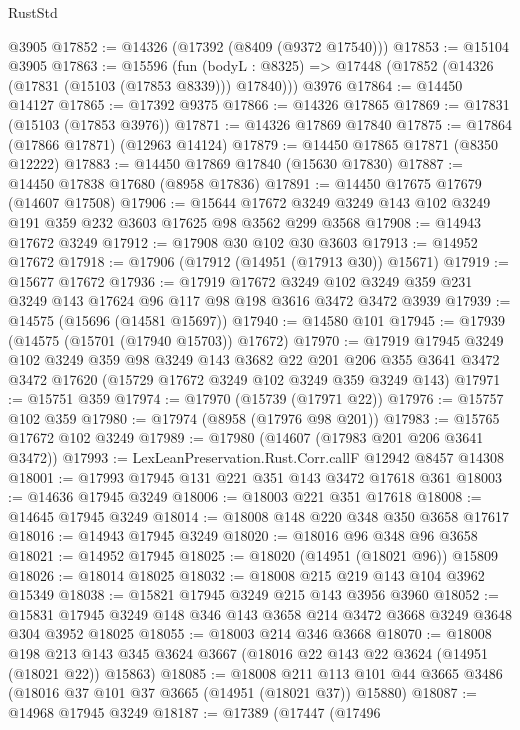 \begin{lexlean}{RustStd}
\begin{coremodule}
    @3905
@17852 := @14326 (@17392 (@8409 (@9372 @17540)))
@17853 := @15104 @3905
@17863 := @15596
    (fun (bodyL : @8325) => @17448 (@17852 (@14326 (@17831 (@15103 (@17853 @8339))) @17840)))
    @3976
@17864 := @14450 @14127
@17865 := @17392 @9375
@17866 := @14326 @17865
@17869 := @17831 (@15103 (@17853 @3976))
@17871 := @14326 @17869 @17840
@17875 := @17864 (@17866 @17871) (@12963 @14124)
@17879 := @14450 @17865 @17871 (@8350 @12222)
@17883 := @14450 @17869 @17840 (@15630 @17830)
@17887 := @14450 @17838 @17680 (@8958 @17836)
@17891 := @14450 @17675 @17679 (@14607 @17508)
@17906 := @15644 @17672 @3249 @3249 @143 @102 @3249 @191 @359 @232 @3603 @17625 @98 @3562 @299 @3568
@17908 := @14943 @17672 @3249
@17912 := @17908 @30 @102 @30 @3603
@17913 := @14952 @17672
@17918 := @17906 (@17912 (@14951 (@17913 @30)) @15671)
@17919 := @15677 @17672
@17936 := @17919
    @17672
    @3249
    @102
    @3249
    @359
    @231
    @3249
    @143
    @17624
    @96
    @117
    @98
    @198
    @3616
    @3472
    @3472
    @3939
@17939 := @14575 (@15696 (@14581 @15697))
@17940 := @14580 @101
@17945 := @17939 (@14575 (@15701 (@17940 @15703)) @17672)
@17970 := @17919
    @17945
    @3249
    @102
    @3249
    @359
    @98
    @3249
    @143
    @3682
    @22
    @201
    @206
    @355
    @3641
    @3472
    @3472
    @17620
    (@15729 @17672 @3249 @102 @3249 @359 @3249 @143)
@17971 := @15751 @359
@17974 := @17970 (@15739 (@17971 @22))
@17976 := @15757 @102 @359
@17980 := @17974 (@8958 (@17976 @98 @201))
@17983 := @15765 @17672 @102 @3249
@17989 := @17980 (@14607 (@17983 @201 @206 @3641 @3472))
@17993 := LexLeanPreservation.Rust.Corr.callF @12942 @8457 @14308
@18001 := @17993 @17945 @131 @221 @351 @143 @3472 @17618 @361
@18003 := @14636 @17945 @3249
@18006 := @18003 @221 @351 @17618
@18008 := @14645 @17945 @3249
@18014 := @18008 @148 @220 @348 @350 @3658 @17617
@18016 := @14943 @17945 @3249
@18020 := @18016 @96 @348 @96 @3658
@18021 := @14952 @17945
@18025 := @18020 (@14951 (@18021 @96)) @15809
@18026 := @18014 @18025
@18032 := @18008 @215 @219 @143 @104 @3962 @15349
@18038 := @15821 @17945 @3249 @215 @143 @3956 @3960
@18052 := @15831 @17945 @3249 @148 @346 @143 @3658 @214 @3472 @3668 @3249 @3648 @304 @3952 @18025
@18055 := @18003 @214 @346 @3668
@18070 := @18008
    @198
    @213
    @143
    @345
    @3624
    @3667
    (@18016 @22 @143 @22 @3624 (@14951 (@18021 @22)) @15863)
@18085 := @18008
    @211
    @113
    @101
    @44
    @3665
    @3486
    (@18016 @37 @101 @37 @3665 (@14951 (@18021 @37)) @15880)
@18087 := @14968 @17945 @3249
@18187 := @17389
    (@17447
      (@17496

\end{coremodule}
\end{lexlean}
